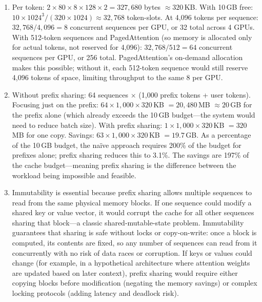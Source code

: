 \begin{enumerate}
  \item Per token: $2 \times 80 \times 8 \times 128 \times 2 = 327{,}680$ bytes $\approx 320$\,KB. With 10\,GB free: $10 \times 1024^3 / (320 \times 1024) \approx 32{,}768$ token-slots. At 4,096 tokens per sequence: $32{,}768 / 4{,}096 = 8$ concurrent sequences per GPU, or 32 total across 4 GPUs. With 512-token sequences and PagedAttention (so memory is allocated only for actual tokens, not reserved for 4,096): $32{,}768 / 512 = 64$ concurrent sequences per GPU, or 256 total. PagedAttention's on-demand allocation makes this possible; without it, each 512-token sequence would still reserve 4,096 tokens of space, limiting throughput to the same 8 per GPU.

  \item Without prefix sharing: 64 sequences $\times$ (1,000 prefix tokens + user tokens). Focusing just on the prefix: $64 \times 1{,}000 \times 320$\,KB $= 20{,}480$\,MB $\approx 20$\,GB for the prefix alone (which already exceeds the 10\,GB budget---the system would need to reduce batch size). With prefix sharing: $1 \times 1{,}000 \times 320$\,KB $= 320$\,MB for one copy. Savings: $63 \times 1{,}000 \times 320$\,KB $= 19.7$\,GB. As a percentage of the 10\,GB budget, the na\"ive approach requires 200\% of the budget for prefixes alone; prefix sharing reduces this to 3.1\%. The savings are 197\% of the cache budget---meaning prefix sharing is the difference between the workload being impossible and feasible.

  \item Immutability is essential because prefix sharing allows multiple sequences to read from the same physical memory blocks. If one sequence could modify a shared key or value vector, it would corrupt the cache for all other sequences sharing that block---a classic shared-mutable-state problem. Immutability guarantees that sharing is safe without locks or copy-on-write: once a block is computed, its contents are fixed, so any number of sequences can read from it concurrently with no risk of data races or corruption. If keys or values could change (for example, in a hypothetical architecture where attention weights are updated based on later context), prefix sharing would require either copying blocks before modification (negating the memory savings) or complex locking protocols (adding latency and deadlock risk).
\end{enumerate}
